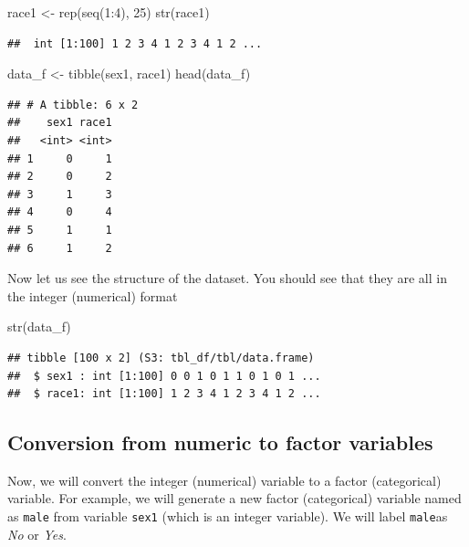 \documentclass[
]{book}
\makeatletter
\newenvironment{Shaded}{\begin{snugshade}}{\end{snugshade}}
\newcommand{\DecValTok}[1]{\textcolor[rgb]{0.06,0.06,0.06}{#1}}
\newcommand{\FunctionTok}[1]{\textcolor[rgb]{0,0,0}{#1}}
\newcommand{\NormalTok}[1]{#1}
\newcommand{\OtherTok}[1]{\textcolor[rgb]{0.37,0.37,0.37}{#1}}
\newcommand{\SpecialCharTok}[1]{\textcolor[rgb]{0,0,0}{#1}}
\newenvironment{kframe}{%
\medskip{}
\setlength{\fboxsep}{.8em}
 \def\at@end@of@kframe{}%
 \ifinner\ifhmode%
  \def\at@end@of@kframe{\end{minipage}}%
  \begin{minipage}{\columnwidth}%
 \fi\fi%
 \def\FrameCommand##1{\hskip\@totalleftmargin \hskip-\fboxsep
 \colorbox{shadecolor}{##1}\hskip-\fboxsep
     \hskip-\linewidth \hskip-\@totalleftmargin \hskip\columnwidth}%
 \MakeFramed {\advance\hsize-\width
   \@totalleftmargin\z@ \linewidth\hsize
   \@setminipage}}%
 {\par\unskip\endMakeFramed%
 \at@end@of@kframe}
\renewenvironment{Shaded}{\begin{kframe}}{\end{kframe}}
\makeatother
\begin{document}
\begin{Shaded}
\begin{Highlighting}[]
\NormalTok{race1 }\OtherTok{\textless{}{-}} \FunctionTok{rep}\NormalTok{(}\FunctionTok{seq}\NormalTok{(}\DecValTok{1}\SpecialCharTok{:}\DecValTok{4}\NormalTok{), }\DecValTok{25}\NormalTok{)}
\FunctionTok{str}\NormalTok{(race1)}
\end{Highlighting}
\end{Shaded}

\begin{verbatim}
##  int [1:100] 1 2 3 4 1 2 3 4 1 2 ...
\end{verbatim}

\begin{Shaded}
\begin{Highlighting}[]
\NormalTok{data\_f }\OtherTok{\textless{}{-}} \FunctionTok{tibble}\NormalTok{(sex1, race1)}
\FunctionTok{head}\NormalTok{(data\_f)}
\end{Highlighting}
\end{Shaded}

\begin{verbatim}
## # A tibble: 6 x 2
##    sex1 race1
##   <int> <int>
## 1     0     1
## 2     0     2
## 3     1     3
## 4     0     4
## 5     1     1
## 6     1     2
\end{verbatim}

Now let us see the structure of the dataset. You should see that they are all in the integer (numerical) format

\begin{Shaded}
\begin{Highlighting}[]
\FunctionTok{str}\NormalTok{(data\_f)}
\end{Highlighting}
\end{Shaded}

\begin{verbatim}
## tibble [100 x 2] (S3: tbl_df/tbl/data.frame)
##  $ sex1 : int [1:100] 0 0 1 0 1 1 0 1 0 1 ...
##  $ race1: int [1:100] 1 2 3 4 1 2 3 4 1 2 ...
\end{verbatim}

\hypertarget{conversion-from-numeric-to-factor-variables}{%
\subsection{Conversion from numeric to factor variables}\label{conversion-from-numeric-to-factor-variables}}

Now, we will convert the integer (numerical) variable to a factor (categorical) variable. For example, we will generate a new factor (categorical) variable named as \texttt{male} from variable \texttt{sex1} (which is an integer variable). We will label \texttt{male}as \emph{No} or \emph{Yes}.
\end{document}
